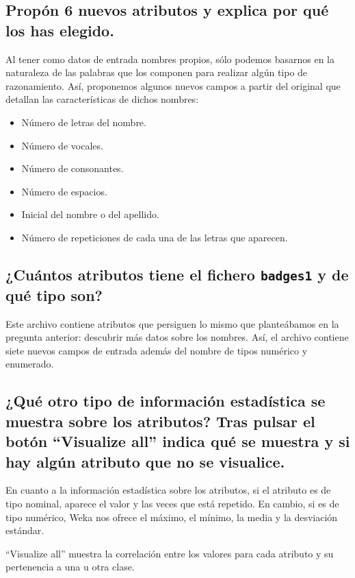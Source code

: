 \documentclass[12pt]{article}
\begin{document}
\subsection*{\small Propón 6 nuevos atributos y explica por qué los has elegido.}

Al tener como datos de entrada nombres propios, sólo podemos basarnos en la
naturaleza de las palabras que los componen para realizar algún tipo de
razonamiento. Así, proponemos algunos nuevos campos a partir del original que
detallan las características de dichos nombres:

\begin{itemize}
    \item Número de letras del nombre.
    \item Número de vocales.
    \item Número de consonantes.
    \item Número de espacios.
    \item Inicial del nombre o del apellido.
    \item Número de repeticiones de cada una de las letras que aparecen.
\end{itemize}

\subsection*{\small ¿Cuántos atributos tiene el fichero \texttt{badges1} y de
qué tipo son?}

Este archivo contiene atributos que persiguen lo mismo que planteábamos en la
pregunta anterior: descubrir más datos sobre los nombres. Así, el archivo
contiene siete nuevos campos de entrada además del nombre de tipos numérico y
enumerado.

\subsection*{\small ¿Qué otro tipo de información estadística se muestra sobre
los atributos? Tras pulsar el botón ``Visualize all'' indica qué se muestra y
si hay algún atributo que no se visualice.}

En cuanto a la información estadística sobre los atributos, si el atributo es
de tipo nominal, aparece el valor y las veces que está repetido. En cambio, si
es de tipo numérico, Weka nos ofrece el máximo, el mínimo, la media y la
desviación estándar.

``Visualize all'' muestra la correlación entre los valores para cada atributo
y su pertenencia a una u otra clase.
\end{document}
